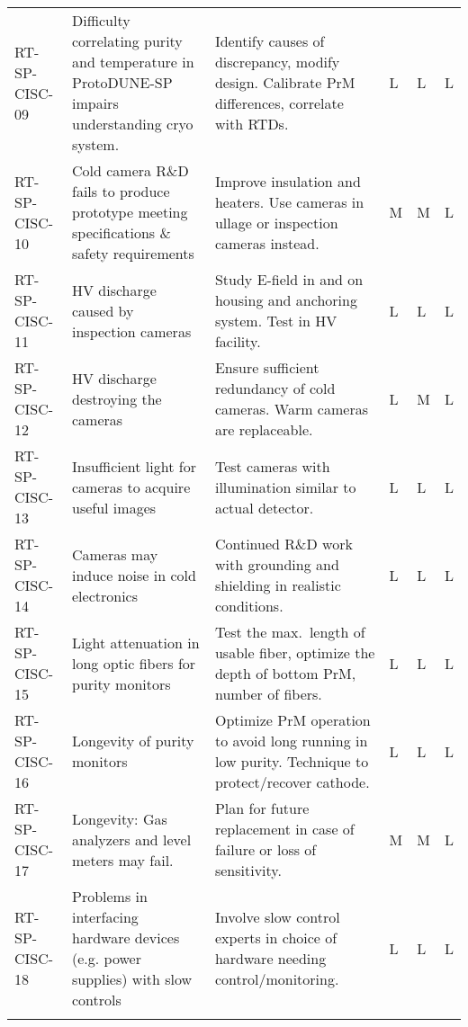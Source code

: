 \begin{footnotesize}
\begin{longtable}{x{0.18\textwidth}x{0.20\textwidth}x{0.32\textwidth}x{0.02\textwidth}x{0.02\textwidth}x{0.02\textwidth}}
RT-SP-CISC-09 & Difficulty correlating purity and temperature in ProtoDUNE-SP impairs understanding cryo system. & Identify causes of discrepancy, modify design. Calibrate PrM differences, correlate with RTDs. & L & L & L \\  \colhline
RT-SP-CISC-10 & Cold camera R\&D fails to produce prototype meeting specifications \& safety requirements & Improve insulation and heaters. Use cameras in ullage or inspection cameras instead. & M & M & L \\  \colhline
RT-SP-CISC-11 & HV discharge caused by inspection cameras & Study E-field in and on housing and anchoring system. Test in HV facility. & L & L & L \\  \colhline
RT-SP-CISC-12 & HV discharge destroying the cameras & Ensure sufficient redundancy of cold cameras. Warm cameras are replaceable. & L & M & L \\  \colhline
RT-SP-CISC-13 & Insufficient light for cameras to acquire useful images & Test cameras with illumination similar to actual detector. & L & L & L \\  \colhline
RT-SP-CISC-14 & Cameras may induce noise in cold electronics & Continued R\&D work with grounding and shielding in realistic conditions. & L & L & L \\  \colhline
RT-SP-CISC-15 & Light attenuation in long optic fibers for purity monitors  & Test the max.\ length of usable fiber, optimize the depth of bottom PrM, number of fibers. & L & L & L \\  \colhline
RT-SP-CISC-16 & Longevity of purity monitors & Optimize PrM operation to avoid long running in low purity. Technique to protect/recover cathode. & L & L & L \\  \colhline
RT-SP-CISC-17 & Longevity: Gas analyzers and level meters may fail. & Plan for future replacement in case of failure or loss of sensitivity.  & M & M & L \\  \colhline
RT-SP-CISC-18 & Problems in interfacing  hardware devices (e.g. power supplies) with slow controls & Involve slow control experts in choice of hardware needing control/monitoring.
 & L & L & L \\  \colhline

\label{tab:risks:SP-FD-CISC}
\end{longtable}
\end{footnotesize}